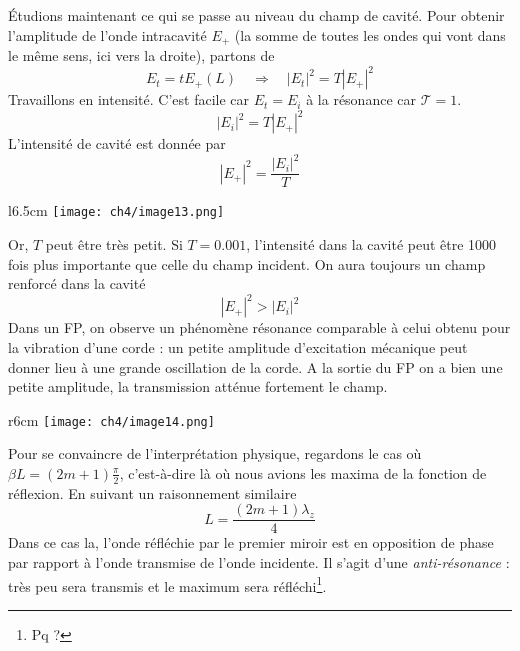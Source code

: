 Étudions maintenant ce qui se passe au niveau du champ de cavité. Pour obtenir l'amplitude de l'onde 
intracavité $E_+$ (la somme de toutes les ondes qui vont dans le même sens, ici vers la droite), partons de 
\begin{equation}
E_t = t E_+(L)\quad\Rightarrow\quad|E_t|^2 = T|E_+|^2
\end{equation}
Travaillons en intensité. C'est facile car $E_t=E_i$ à la résonance car $\mathcal{T}=1$.
\begin{equation}
|E_i|^2 = T|E_+|^2
\end{equation}
L'intensité de cavité est donnée par 
\begin{equation}
|E_+|^2 = \frac{|E_i|^2}{T}
\end{equation}

	\begin{wrapfigure}[11]{l}{6.5cm}
	\vspace{-15mm}
	\texttt{[image: ch4/image13.png]}
	\end{wrapfigure}
Or, $T$ peut être très petit. Si $T=0.001$, l'intensité dans la cavité peut être 1000 fois plus 
importante que celle du champ incident. On aura toujours un champ renforcé dans la cavité
\begin{equation}
|E_+|^2> |E_i|^2
\end{equation}
Dans un FP, on observe un phénomène résonance comparable à celui obtenu pour la vibration d'une 
corde : un petite amplitude d'excitation mécanique peut donner lieu à une grande oscillation de 
la corde. A la sortie du FP on a bien une petite amplitude, la transmission atténue fortement le 
champ.\\


	\begin{wrapfigure}[11]{r}{6cm}
	\vspace{-5mm}
	\texttt{[image: ch4/image14.png]}
	\end{wrapfigure}
Pour se convaincre de l'interprétation physique, regardons le cas où $\beta L = (2m+1)\frac{\pi}{
2}$, c'est-à-dire là où nous avions les maxima de la fonction de réflexion. En suivant un raisonnement 
similaire
\begin{equation}
L = \frac{(2m+1)\lambda_z}{4}
\end{equation}
Dans ce cas la, l'onde réfléchie par le premier miroir est en opposition de phase par rapport à l'onde 
transmise de l'onde incidente. Il s'agit d'une \textit{anti-résonance} : très peu sera transmis et le 
maximum sera réfléchi\footnote{Pq ?}.



